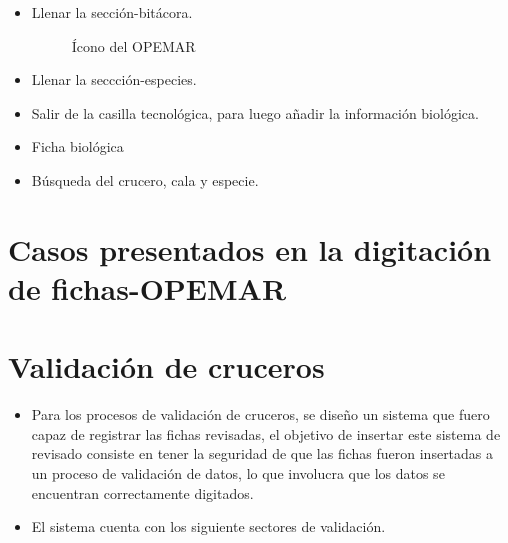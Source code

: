 \documentclass[a4paper,oneside,11pt]{book}
\begin{document}
\begin{itemize}
\newpage

\item Llenar la sección-bitácora. 


\begin{figure}[!h]
 \begin{center} 
 \caption{Ícono del OPEMAR}
\end{center}
 \end{figure}





\item Llenar la seccción-especies.
\item Salir de la casilla tecnológica, para luego añadir la información biológica.
\item Ficha biológica
\item Búsqueda del crucero, cala y especie.

\end{itemize}



\chapter{Casos presentados en la digitación de fichas-OPEMAR}

\chapter{Validación de cruceros}

\begin{itemize}
\item [ ] Para los procesos de validación de cruceros, se diseño un sistema que fuero capaz de registrar las fichas revisadas, el objetivo de insertar este sistema de revisado consiste en tener la seguridad de que las fichas fueron insertadas a un proceso de validación de datos, lo que involucra que los datos se encuentran correctamente digitados.
\item [] El sistema cuenta con los siguiente sectores de validación.

\end{itemize}
\end{document}
